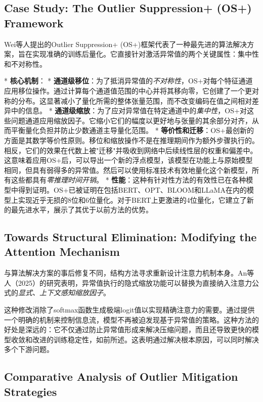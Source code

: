 \documentclass{article}
\begin{document}
\subsection{Case Study: The Outlier Suppression+ (OS+) Framework}

Wei等人\cite{wei2023outlier}提出的Outlier Suppression+ (OS+)框架代表了一种最先进的算法解决方案，旨在实现准确的训练后量化。它直接针对激活异常值的两个关键属性：集中性和不对称性。

* \textbf{核心机制}：
  * \textbf{通道级移位}：为了抵消异常值的\emph{不对称性}，OS+对每个特征通道应用移位操作。通过计算每个通道值范围的中心并将其移向零，它创建了一个更对称的分布。这显著减小了量化所需的整体张量范围，而不改变编码在值之间相对差异中的信息。
  * \textbf{通道级缩放}：为了应对异常值在特定通道中的\emph{集中性}，OS+对这些问题通道应用缩放因子。它缩小它们的幅度以更好地与张量的其余部分对齐，从而平衡量化负担并防止少数通道主导量化范围。
* \textbf{等价性和迁移}：OS+最创新的方面是其数学等价性原则。移位和缩放操作不是在推理期间作为额外步骤执行的。相反，它们的效果在代数上被"迁移"并吸收到网络中后续线性层的权重和偏差中。这意味着应用OS+后，可以导出一个新的浮点模型，该模型在功能上与原始模型相同，但具有弱得多的异常值。然后可以使用标准技术有效地量化这个新模型，所有这些都具有\emph{零推理时间开销}。
* \textbf{性能}：这种有针对性方法的有效性已在各种模型中得到证明。OS+已被证明在包括BERT、OPT、BLOOM和LLaMA在内的模型上实现近乎无损的8位和6位量化。对于BERT上更激进的4位量化，它建立了新的最先进水平，展示了其优于以前方法的优势。

\subsection{Towards Structural Elimination: Modifying the Attention Mechanism}

与算法解决方案的事后修复不同，结构方法寻求重新设计注意力机制本身。An等人（2025）的研究表明，异常值执行的隐式缩放功能可以替换为直接纳入注意力公式的\emph{显式、上下文感知缩放因子}。

这种修改消除了softmax函数生成极端logit值以实现精确注意力的需要。通过提供一个明确的机制来控制信息流，模型不再被迫发现基于异常值的策略。这种方法的好处是深远的：它不仅通过防止异常值形成来解决压缩问题，而且还导致更快的模型收敛和改进的训练稳定性，如前所述。这表明通过解决根本原因，可以同时解决多个下游问题。

\subsection{Comparative Analysis of Outlier Mitigation Strategies}
\end{document}
